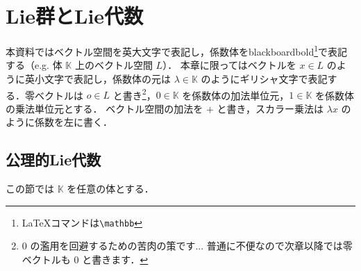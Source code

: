 \documentclass[rep_main]{subfiles}
\begin{document}
\chapter{Lie群とLie代数}

本資料ではベクトル空間を英大文字で表記し，係数体をblackboardbold\footnote{\LaTeX コマンドは\texttt{\textbackslash mathbb}}で表記する（e.g. 体 $\mathbb{K}$ 上のベクトル空間 $L$）．
本章に限ってはベクトルを $x \in L$ のように英小文字で表記し，係数体の元は $\lambda \in \mathbb{K}$ のようにギリシャ文字で表記する．零ベクトルは $o \in L$ と書き\footnote{$0$ の濫用を回避するための苦肉の策です... 普通に不便なので次章以降では零ベクトルも $0$ と書きます．}，$0 \in \mathbb{K}$ を係数体の加法単位元，$1 \in \mathbb{K}$ を係数体の乗法単位元とする．
ベクトル空間の加法を $+$ と書き，スカラー乗法は $\lambda x$ のように係数を左に書く．

\section{公理的Lie代数}

この節では $\mathbb{K}$ を任意の体とする．
\end{document}
